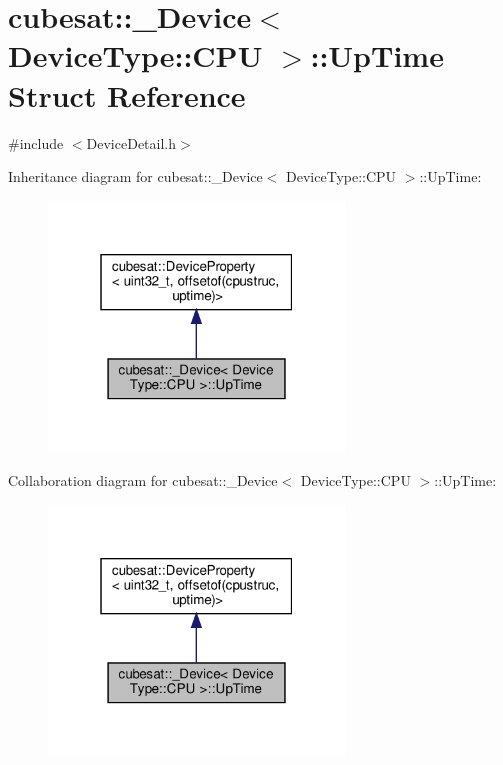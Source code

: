 \hypertarget{structcubesat_1_1__Device_3_01DeviceType_1_1CPU_01_4_1_1UpTime}{}\section{cubesat\+:\+:\+\_\+\+Device$<$ Device\+Type\+:\+:C\+PU $>$\+:\+:Up\+Time Struct Reference}
\label{structcubesat_1_1__Device_3_01DeviceType_1_1CPU_01_4_1_1UpTime}


{\ttfamily \#include $<$Device\+Detail.\+h$>$}



Inheritance diagram for cubesat\+:\+:\+\_\+\+Device$<$ Device\+Type\+:\+:C\+PU $>$\+:\+:Up\+Time\+:\nopagebreak
\begin{figure}[H]
\begin{center}
\leavevmode
\includegraphics[width=223pt]{structcubesat_1_1__Device_3_01DeviceType_1_1CPU_01_4_1_1UpTime__inherit__graph}
\end{center}
\end{figure}


Collaboration diagram for cubesat\+:\+:\+\_\+\+Device$<$ Device\+Type\+:\+:C\+PU $>$\+:\+:Up\+Time\+:\nopagebreak
\begin{figure}[H]
\begin{center}
\leavevmode
\includegraphics[width=223pt]{structcubesat_1_1__Device_3_01DeviceType_1_1CPU_01_4_1_1UpTime__coll__graph}
\end{center}
\end{figure}
